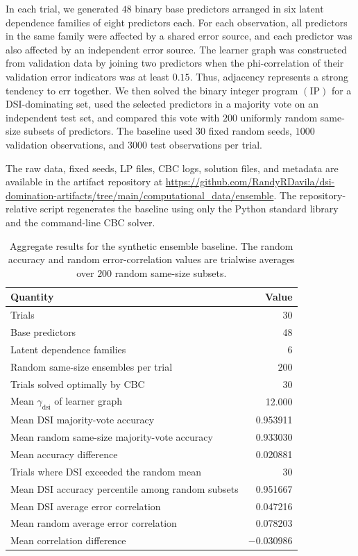 \documentclass[11pt]{article}
\theoremstyle{definition}
\theoremstyle{remark}
\newcommand{\dsi}{\mathrm{dsi}}
\newcommand{\ArtifactEnsembleDir}{\url{https://github.com/RandyRDavila/dsi-domination-artifacts/tree/main/computational_data/ensemble}}
\begin{document}
In each trial, we generated \(48\) binary base predictors arranged in six
latent dependence families of eight predictors each. For each observation,
all predictors in the same family were affected by a shared error source,
and each predictor was also affected by an independent error source. The
learner graph was constructed from validation data by joining two predictors
when the phi-correlation of their validation error indicators was at least
\(0.15\). Thus, adjacency represents a strong tendency to err together. We
then solved the binary integer program \((\mathrm{IP})\) for a
DSI-dominating set, used the selected predictors in a majority vote on an
independent test set, and compared this vote with \(200\) uniformly random
same-size subsets of predictors. The baseline used \(30\) fixed random
seeds, \(1000\) validation observations, and \(3000\) test observations per
trial.

The raw data, fixed seeds, LP files, CBC logs, solution files, and metadata
are available in the artifact repository at \ArtifactEnsembleDir. The
repository-relative script
 regenerates the
baseline using only the Python standard library and the command-line CBC
solver.

\begin{table}[H]
\centering
\small
\begin{tabular}{lr}
\hline
Quantity & Value \\
\hline
Trials & 30 \\
Base predictors & 48 \\
Latent dependence families & 6 \\
Random same-size ensembles per trial & 200 \\
Trials solved optimally by CBC & 30 \\
Mean \(\gamma_{\dsi}\) of learner graph & 12.000 \\
Mean DSI majority-vote accuracy & 0.953911 \\
Mean random same-size majority-vote accuracy & 0.933030 \\
Mean accuracy difference & 0.020881 \\
Trials where DSI exceeded the random mean & 30 \\
Mean DSI accuracy percentile among random subsets & 0.951667 \\
Mean DSI average error correlation & 0.047216 \\
Mean random average error correlation & 0.078203 \\
Mean correlation difference & \(-0.030986\) \\
\hline
\end{tabular}
\caption{Aggregate results for the synthetic ensemble baseline. The random
accuracy and random error-correlation values are trialwise averages over
\(200\) random same-size subsets.}
\label{tab:ensemble-experiment}
\end{table}
\end{document}

